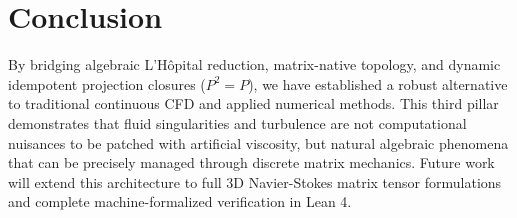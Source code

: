 \documentclass[11pt,a4paper]{article}
\begin{document}
\section{Conclusion}
By bridging algebraic L'Hôpital reduction, matrix-native topology, and dynamic idempotent projection closures ($P^2 = P$), we have established a robust alternative to traditional continuous CFD and applied numerical methods. This third pillar demonstrates that fluid singularities and turbulence are not computational nuisances to be patched with artificial viscosity, but natural algebraic phenomena that can be precisely managed through discrete matrix mechanics. Future work will extend this architecture to full 3D Navier-Stokes matrix tensor formulations and complete machine-formalized verification in Lean 4.
\end{document}
